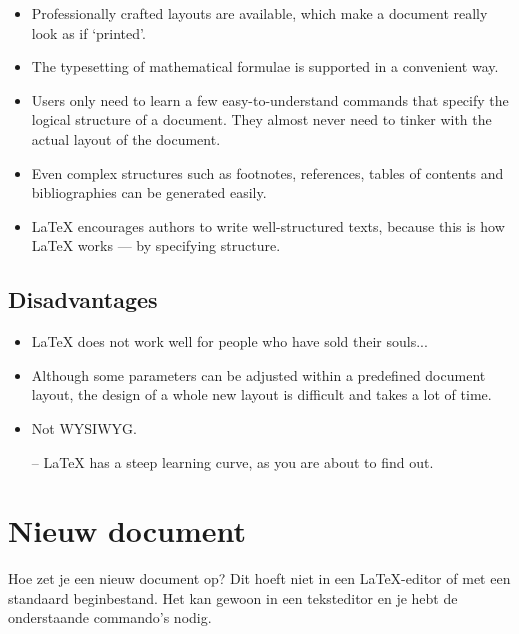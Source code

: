 \begin{itemize}
	\renewcommand{\labelitemi}{\(+\)}
	\item Professionally crafted layouts are available, which make a document
	really look as if `printed'.
	\item The typesetting of mathematical formulae is supported in a convenient
	way.
	\item Users only need to learn a few easy-to-understand commands that
	specify the logical structure of a document. They almost never need to
	tinker with the actual layout of the document.
	\item Even complex structures such as footnotes, references, tables of
	contents and bibliographies can be generated easily.
	\item \LaTeX{} encourages authors to write well-structured texts, because
	this is how \LaTeX{}  works --- by specifying structure.
\end{itemize}

\subsection{Disadvantages}
\begin{itemize}
	\renewcommand{\labelitemi}{\(-\)}
	\item \LaTeX{} does not work well for people who have sold their souls...
	\item Although some parameters can be adjusted within a predefined document
	layout, the design of a whole new layout is difficult and takes a lot of
	time.
	\item Not WYSIWYG.
	\item[--] \LaTeX{} has a steep learning curve, as you are about to find out.
\end{itemize}


\section{Nieuw document}

Hoe zet je een nieuw document op? Dit hoeft niet in een \LaTeX-editor of met een
standaard beginbestand. Het kan gewoon in een teksteditor en je hebt de
onderstaande commando's nodig.


